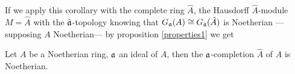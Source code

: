 If we apply this corollary with the complete ring $\hat A$, the Hausdorff $\hat A$-module $M=\hat A$ with the $\hat{\mathfrak{a}}$-topology knowing that $G_{\mathfrak{a}}(A)\cong G_{\hat{\mathfrak{a}}}(\hat A)$ is Noetherian ---supposing $A$ Noetherian--- by proposition \ref{properties1} we get
\begin{thm}
    Let $A$ be a Noetherian ring, $\mathfrak{a}$ an ideal of $A$, then the $\mathfrak{a}$-completion $\hat A$ of $A$ is Noetherian.
\end{thm}